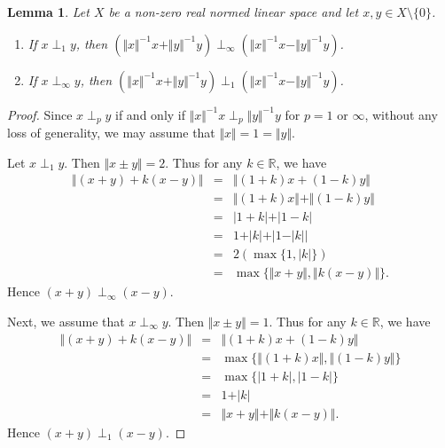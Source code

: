 \documentclass[12pt]{amsart}
\newtheorem{lemma}[theorem]{Lemma}
\begin{document}
\begin{lemma}\label{pd}
	Let $X$ be a non-zero real normed linear space and let $x, y \in X \setminus \lbrace 0 \rbrace$.
	\begin{enumerate}
		\item If $x \perp_1 y$, then $(\Vert x \Vert^{-1} x + \Vert y \Vert^{-1} y) \perp_{\infty} (\Vert x \Vert^{-1} x - \Vert y \Vert^{-1} y)$. 
		\item If $x \perp_{\infty} y$, then $(\Vert x \Vert^{-1} x + \Vert y \Vert^{-1} y) \perp_1 (\Vert x \Vert^{-1} x - \Vert y \Vert^{-1} y)$. 
	\end{enumerate}
\end{lemma} 
\begin{proof}
	Since $x \perp_p y$ if and only if $\Vert x \Vert^{-1} x \perp_p \Vert y \Vert^{-1} y$ for $p = 1$ or $\infty$, without any loss of generality, we may assume that $\Vert x \Vert = 1 = \Vert y \Vert$. 
	
	Let $x \perp_1 y$. Then $\Vert x \pm y \Vert = 2$. Thus for any $k \in \mathbb{R}$, we have 
	\begin{eqnarray*}
		\Vert (x + y) + k (x - y) \Vert &=& \Vert (1 + k) x + (1 - k) y \Vert \\
		&=& \Vert (1 + k) x \Vert + \Vert (1 - k) y \Vert \\ 
		&=& \vert 1 + k \vert + \vert 1 - k \vert \\ 
		&=& 1 + \vert k \vert + \vert 1 - \vert k \vert \vert \\ 
		&=& 2 \left( \max \lbrace 1, \vert k \vert \rbrace \right) \\ 
		&=& \max \lbrace \Vert x + y \Vert, \Vert k (x - y) \Vert \rbrace.
	\end{eqnarray*} 
	Hence $(x + y) \perp_{\infty} (x - y)$. 
	
	Next, we assume that $x \perp_{\infty} y$. Then $\Vert x \pm y \Vert = 1$. Thus for any $k \in \mathbb{R}$, we have 
	\begin{eqnarray*}
		\Vert (x + y) + k (x - y) \Vert &=& \Vert (1 + k) x + (1 - k) y \Vert \\
		&=& \max \lbrace \Vert (1 + k) x \Vert, \Vert (1 - k) y \Vert \rbrace \\ 
		&=& \max \lbrace \vert 1 + k \vert, \vert 1 - k \vert \rbrace \\ 
		&=& 1 + \vert k \vert \\ 
		&=& \Vert x + y \Vert + \Vert k (x - y) \Vert.
	\end{eqnarray*} 
	Hence $(x + y) \perp_1 (x - y)$. 
\end{proof} 
\end{document}
